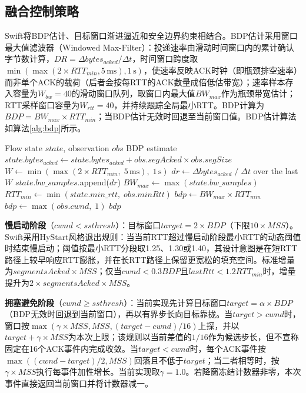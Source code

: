 \documentclass[10pt,twocolumn]{article}
\begin{document}
\subsection{融合控制策略}

Swift将BDP估计、目标窗口渐进逼近和安全边界约束相结合。BDP估计采用窗口最大值滤波器（Windowed Max-Filter）：投递速率由滑动时间窗口内的累计确认字节数计算，$DR = \Delta bytes_{acked} / \Delta t$，时间窗口跨度取$\min(\max(2 \times RTT_{min}, 5\,\text{ms}), 1\,\text{s})$，使速率反映ACK时钟（即瓶颈排空速率）而非单个ACK的载荷（后者会按每RTT的ACK数量成倍低估带宽）；速率样本存入容量为$W_{bw}=40$的滑动窗口队列，取窗口内最大值$BW_{max}$作为瓶颈带宽估计；RTT采样窗口容量为$W_{rtt}=40$，并持续跟踪全局最小RTT。BDP计算为$BDP = BW_{max} \times RTT_{min}$；当BDP估计无效时回退至当前窗口值。BDP估计算法如算法\ref{alg:bdp}所示。

\begin{algorithm}[htbp]
\caption{Windowed Max-Filter BDP Estimation}
\label{alg:bdp}
\small
\begin{algorithmic}[1]
\REQUIRE Flow state $state$, observation $obs$
\ENSURE BDP estimate
\STATE $state.bytes_{acked} \leftarrow state.bytes_{acked} + obs.segAcked \times obs.segSize$
\STATE $W \leftarrow \min(\max(2 \times RTT_{min}, \; 5\,\text{ms}), \; 1\,\text{s})$ 
\STATE $dr \leftarrow \Delta bytes_{acked} \;/\; \Delta t$ over the last $W$ 
\STATE $state.bw\_samples$.append($dr$) 
\STATE $BW_{max} \leftarrow \max(state.bw\_samples)$
\STATE $RTT_{min} \leftarrow \min(state.min\_rtt, \; obs.minRtt)$
\STATE $bdp \leftarrow BW_{max} \times RTT_{min}$
    \STATE $bdp \leftarrow \max(obs.cwnd, \; 1)$ 
\ENDIF
\RETURN $bdp$
\end{algorithmic}
\end{algorithm}

\textbf{慢启动阶段}（$cwnd < ssthresh$）：目标窗口$target = 2 \times BDP$（下限$10 \times MSS$）。Swift采用HyStart风格退出规则：当当前RTT超过慢启动阶段最小RTT的动态阈值时结束慢启动；阈值按最小RTT分段取1.25、1.30或1.40，其设计意图是在短RTT路径上较早响应RTT膨胀，并在长RTT路径上保留更宽松的填充空间。标准增量为$segmentsAcked \times MSS$；仅当$cwnd<0.3BDP$且$lastRtt<1.2RTT_{min}$时，增量提升为$2 \times segmentsAcked \times MSS$。

\textbf{拥塞避免阶段}（$cwnd \geq ssthresh$）：当前实现先计算目标窗口$target=\alpha \times BDP$（BDP无效时回退到当前窗口），再以有界步长向目标靠拢。当$target>cwnd$时，窗口按$\max(\gamma\times MSS, MSS, (target-cwnd)/16)$上探，并以$target+\gamma\times MSS$为本次上限；该规则以当前差值的$1/16$作为候选步长，但不宣称固定在16个ACK事件内完成收敛。当$target<cwnd$时，每个ACK事件按$\max((cwnd-target)/2, MSS)$回落且不低于$target$；当二者相等时，按$\gamma\times MSS$执行每事件加性增长。当前实现取$\gamma=1.0$。若降窗冻结计数器非零，本次事件直接返回当前窗口并将计数器减一。
\end{document}
